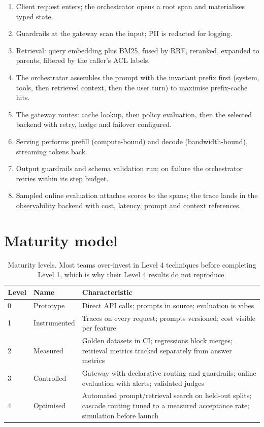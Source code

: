 \documentclass[11pt,twoside,openright]{book}
\theoremstyle{definition}
\theoremstyle{plain}
\theoremstyle{remark}
\begin{document}
\begin{enumerate}[leftmargin=1.8em,itemsep=2pt]
  \item Client request enters; the orchestrator opens a root span and
        materialises typed state.
  \item Guardrails at the gateway scan the input; PII is redacted for logging.
  \item Retrieval: query embedding plus BM25, fused by RRF, reranked, expanded
        to parents, filtered by the caller's ACL labels.
  \item The orchestrator assembles the prompt with the invariant prefix first
        (system, tools, then retrieved context, then the user turn) to maximise
        prefix-cache hits.
  \item The gateway routes: cache lookup, then policy evaluation, then the
        selected backend with retry, hedge and failover configured.
  \item Serving performs prefill (compute-bound) and decode (bandwidth-bound),
        streaming tokens back.
  \item Output guardrails and schema validation run; on failure the orchestrator
        retries within its step budget.
  \item Sampled online evaluation attaches scores to the spans; the trace lands
        in the observability backend with cost, latency, prompt and context
        references.
\end{enumerate}

\section{Maturity model}

\begin{table}[H]
\centering\footnotesize
\renewcommand{\arraystretch}{1.3}
\begin{tabularx}{\textwidth}{@{}p{1.5cm} p{3.1cm} X@{}}
\toprule
\textbf{Level} & \textbf{Name} & \textbf{Characteristic} \\
\midrule
0 & Prototype & Direct API calls; prompts in source; evaluation is vibes \\
1 & Instrumented & Traces on every request; prompts versioned; cost visible per feature \\
2 & Measured & Golden datasets in CI; regressions block merges; retrieval metrics tracked separately from answer metrics \\
3 & Controlled & Gateway with declarative routing and guardrails; online evaluation with alerts; validated judges \\
4 & Optimised & Automated prompt/retrieval search on held-out splits; cascade routing tuned to a measured acceptance rate; simulation before launch \\
\bottomrule
\end{tabularx}
\caption{Maturity levels. Most teams over-invest in Level 4 techniques before
completing Level 1, which is why their Level 4 results do not reproduce.}
\end{table}
\end{document}
